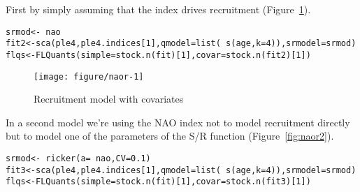 \documentclass[a4paper,english,10pt]{article}\usepackage[]{graphicx}\usepackage[]{color}
\makeatletter
\def\maxwidth{ %
  \ifdim\Gin@nat@width>\linewidth
    \linewidth
  \else
    \Gin@nat@width
  \fi
}
\newcommand{\hlnum}[1]{\textcolor[rgb]{0.2,0.2,0.2}{#1}}%
\newcommand{\hlopt}[1]{\textcolor[rgb]{0.2,0.2,0.2}{#1}}%
\newcommand{\hlstd}[1]{\textcolor[rgb]{0,0,0}{#1}}%
\newcommand{\hlkwb}[1]{\textcolor[rgb]{0.361,0.506,0.596}{#1}}%
\newcommand{\hlkwc}[1]{\textcolor[rgb]{0.361,0.506,0.596}{#1}}%
\newcommand{\hlkwd}[1]{\textcolor[rgb]{0.361,0.506,0.596}{#1}}%
\newenvironment{kframe}{%
 \def\at@end@of@kframe{}%
 \ifinner\ifhmode%
  \def\at@end@of@kframe{\end{minipage}}%
  \begin{minipage}{\columnwidth}%
 \fi\fi%
 \def\FrameCommand##1{\hskip\@totalleftmargin \hskip-\fboxsep
 \colorbox{shadecolor}{##1}\hskip-\fboxsep
     \hskip-\linewidth \hskip-\@totalleftmargin \hskip\columnwidth}%
 \MakeFramed {\advance\hsize-\width
   \@totalleftmargin\z@ \linewidth\hsize
   \@setminipage}}%
 {\par\unskip\endMakeFramed%
 \at@end@of@kframe}
\newenvironment{knitrout}{}{} %
\makeatother
\begin{document}
First by simply assuming that the index drives recruitment (Figure~\ref{fig:naor}).

\begin{knitrout}
\color{fgcolor}\begin{kframe}
\begin{alltt}
\hlstd{srmod} \hlkwb{<-} \hlopt{~} \hlstd{nao}
\hlstd{fit2} \hlkwb{<-} \hlkwd{sca}\hlstd{(ple4, ple4.indices[}\hlnum{1}\hlstd{],} \hlkwc{qmodel}\hlstd{=}\hlkwd{list}\hlstd{(}\hlopt{~}\hlkwd{s}\hlstd{(age,} \hlkwc{k}\hlstd{=}\hlnum{4}\hlstd{)),} \hlkwc{srmodel}\hlstd{=srmod)}
\hlstd{flqs} \hlkwb{<-} \hlkwd{FLQuants}\hlstd{(}\hlkwc{simple}\hlstd{=}\hlkwd{stock.n}\hlstd{(fit)[}\hlnum{1}\hlstd{],} \hlkwc{covar}\hlstd{=}\hlkwd{stock.n}\hlstd{(fit2)[}\hlnum{1}\hlstd{])}
\end{alltt}
\end{kframe}
\end{knitrout}

\begin{knitrout}
\color{fgcolor}\begin{figure}[H]

{\centering \texttt{[image: figure/naor-1]} 

}

\caption[Recruitment model with covariates]{Recruitment model with covariates}\label{fig:naor}
\end{figure}


\end{knitrout}

In a second model we're using the NAO index not to model recruitment directly but to model one of the parameters of the S/R function (Figure~\ref{fig:naor2}). 

\begin{knitrout}
\color{fgcolor}\begin{kframe}
\begin{alltt}
\hlstd{srmod} \hlkwb{<-} \hlopt{~} \hlkwd{ricker}\hlstd{(}\hlkwc{a}\hlstd{=}\hlopt{~}\hlstd{nao,} \hlkwc{CV}\hlstd{=}\hlnum{0.1}\hlstd{)}
\hlstd{fit3} \hlkwb{<-} \hlkwd{sca}\hlstd{(ple4, ple4.indices[}\hlnum{1}\hlstd{],} \hlkwc{qmodel}\hlstd{=}\hlkwd{list}\hlstd{(}\hlopt{~}\hlkwd{s}\hlstd{(age,} \hlkwc{k}\hlstd{=}\hlnum{4}\hlstd{)),} \hlkwc{srmodel}\hlstd{=srmod)}
\hlstd{flqs} \hlkwb{<-} \hlkwd{FLQuants}\hlstd{(}\hlkwc{simple}\hlstd{=}\hlkwd{stock.n}\hlstd{(fit)[}\hlnum{1}\hlstd{],} \hlkwc{covar}\hlstd{=}\hlkwd{stock.n}\hlstd{(fit3)[}\hlnum{1}\hlstd{])}
\end{alltt}
\end{kframe}
\end{knitrout}
\end{document}
